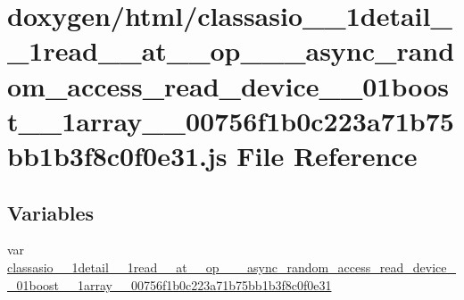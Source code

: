 \hypertarget{classasio__1__1detail__1__1read____at____op__3__01__async__random__access__read__device__00__01b8936dbab3a49971d5cd61a62ec5be1bc}{}\section{doxygen/html/classasio\+\_\+\_\+1detail\+\_\+\_\+1read\+\_\+\+\_\+at\+\_\+\+\_\+op\+\_\+\_\+\_\+async\+\_\+random\+\_\+access\+\_\+read\+\_\+device\+\_\+\_\+01boost\+\_\+\_\+1array\+\_\+\_\+00756f1b0c223a71b75bb1b3f8c0f0e31.js File Reference}
\label{classasio__1__1detail__1__1read____at____op__3__01__async__random__access__read__device__00__01b8936dbab3a49971d5cd61a62ec5be1bc}
\subsection*{Variables}
\begin{DoxyCompactItemize}
\item 
var \hyperlink{classasio__1__1detail__1__1read____at____op__3__01__async__random__access__read__device__00__01b8936dbab3a49971d5cd61a62ec5be1bc_a9af607b230ec06f1a960570e15205c97}{classasio\+\_\+\_\+1detail\+\_\+\_\+1read\+\_\+\+\_\+at\+\_\+\+\_\+op\+\_\+\_\+\_\+async\+\_\+random\+\_\+access\+\_\+read\+\_\+device\+\_\+\_\+01boost\+\_\+\_\+1array\+\_\+\_\+00756f1b0c223a71b75bb1b3f8c0f0e31}
\end{DoxyCompactItemize}


